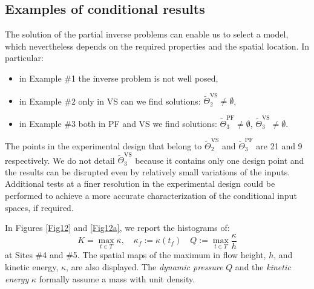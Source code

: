 \documentclass[nhess, manuscript]{copernicus}
\begin{document}
\subsection{Examples of conditional results}
The solution of the partial inverse problems can enable us to select a model, which nevertheless depends on the required properties and the spatial location. In particular:
\begin{itemize}
\item in Example \#1 the inverse problem is not well posed,
\item in Example \#2 only in VS can we find solutions: $\tilde\Theta_2^{\textrm{VS}}\neq\emptyset$,
\item in Example \#3 both in PF and VS we find solutions: $\tilde\Theta_3^{\textrm{PF}}\neq\emptyset$, $\tilde\Theta_3^{\textrm{VS}}\neq\emptyset$.
\end{itemize}
The points in the experimental design that belong to $\tilde\Theta_2^{\textrm{VS}}$ and $\tilde\Theta_3^{\textrm{PF}}$ are 21 and 9 respectively. We do not detail $\tilde\Theta_3^{\textrm{VS}}$ because it contains only one design point and the results can be disrupted even by relatively small variations of the inputs. Additional tests at a finer resolution in the experimental design could be performed to achieve a more accurate characterization of the conditional input spaces, if required.

In Figures \ref{Fig12} and \ref{Fig12a}, we report the histograms of:
$$K=\max_{t\in T}\kappa,\quad \kappa_f:=\kappa(t_f)\quad Q:=\max_{t\in T}\frac{\kappa}{h}$$
at Sites \#4 and \#5. The spatial maps of the maximum in flow height, $h$, and kinetic energy, $\kappa$, are also displayed. The \emph{dynamic pressure} $Q$ and the \emph{kinetic energy} $\kappa$ formally assume a mass with unit density.
\end{document}
